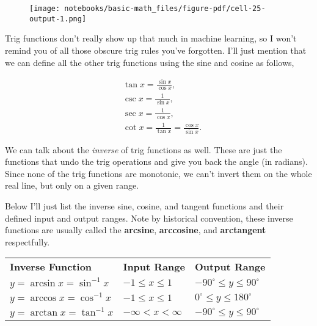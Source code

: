 \documentclass[
  letterpaper,
  DIV=11,
  numbers=noendperiod]{scrreprt}
\begin{document}
\begin{figure}[H]

{\centering \texttt{[image: notebooks/basic-math\_files/figure-pdf/cell-25-output-1.png]}

}

\end{figure}

Trig functions don't really show up that much in machine learning, so I
won't remind you of all those obscure trig rules you've forgotten. I'll
just mention that we can define all the other trig functions using the
sine and cosine as follows,

\begin{align*}
&\tan x = \frac{\sin x}{\cos x}, \\
&\csc x = \frac{1}{\sin x}, \\
&\sec x = \frac{1}{\cos x}, \\
&\cot x = \frac{1}{\tan x} = \frac{\cos x}{\sin x}.
\end{align*}

We can talk about the \emph{inverse} of trig functions as well. These
are just the functions that undo the trig operations and give you back
the angle (in radians). Since none of the trig functions are monotonic,
we can't invert them on the whole real line, but only on a given range.

Below I'll just list the inverse sine, cosine, and tangent functions and
their defined input and output ranges. Note by historical convention,
these inverse functions are usually called the \textbf{arcsine},
\textbf{arccosine}, and \textbf{arctangent} respectfully.

\begin{longtable}[]{@{}
  >{\raggedright\arraybackslash}p{}
  >{\raggedright\arraybackslash}p{}
  >{\raggedright\arraybackslash}p{}@{}}
\toprule()
\endhead
\textbf{Inverse Function} & \textbf{Input Range} & \textbf{Output
Range} \\
\(y = \arcsin x = \sin^{-1} x\) & \(-1 \leq x \leq 1\) &
\(-90^\circ \leq y \leq 90^\circ\) \\
\(y = \arccos x = \cos^{-1} x\) & \(-1 \leq x \leq 1\) &
\(0^\circ \leq y \leq 180^\circ\) \\
\(y = \arctan x = \tan^{-1} x\) & \(-\infty < x < \infty\) &
\(-90^\circ \leq y \leq 90^\circ\) \\
\bottomrule()
\end{longtable}
\end{document}
